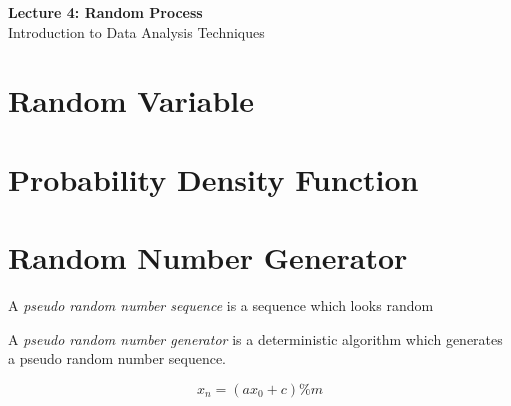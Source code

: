 \documentclass[12pt]{article}
\numberwithin{figure}{section}
\begin{document}
\begin{center}
  {\LARGE\bfseries Lecture 4: Random Process}\\[0.25em]
  {\large Introduction to Data Analysis Techniques}\\[0.15em]
\end{center}

\section{Random Variable} 

\section{Probability Density Function}

\section{Random Number Generator} 

\begin{dfn}
A \emph{pseudo random number sequence} is a sequence which looks random 
\end{dfn} 

\begin{dfn}
A \emph{pseudo random number generator} is a deterministic algorithm which generates a pseudo random number sequence. 
\end{dfn} 

\begin{example}
\[x_n = (a x_0 + c) \% m\]
\end{example}
\end{document}
